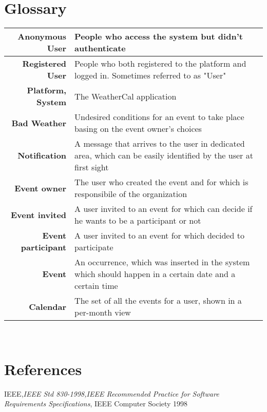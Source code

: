 \section{Glossary}
\begin{tabularx}{\linewidth}{|r|X|}
  \hline  {\bf Anonymous User} & People who access the system but didn't authenticate\\ 
  \hline  {\bf Registered User} & People who both registered to the platform and logged in. Sometimes referred to as "User"\\ 
  \hline  {\bf Platform, System} & The WeatherCal application\\
  \hline  {\bf Bad Weather}&  Undesired conditions for an event to take place basing on the event owner's choices\\
  \hline  {\bf Notification} & A message that arrives to the user in dedicated area, which can be easily identified by the user at first sight\\
  \hline  {\bf Event owner} & The user who created the event and for which is responsibile of the organization\\
  \hline  {\bf Event invited} & A user invited to an event for which can decide if he wants to be a participant or not\\
  \hline  {\bf Event participant} & A user invited to an event for which decided to participate\\
  \hline  {\bf Event} & An occurrence, which was inserted in the system which should happen in a certain date and a certain time\\
  \hline  {\bf Calendar} & The set of all the events for a user, shown in a per-month view\\
  \hline
\end{tabularx}\\
\section{References}
IEEE,{\it IEEE Std 830-1998,IEEE Recommended Practice for Software Requirements Specifications},  IEEE Computer Society 1998

 